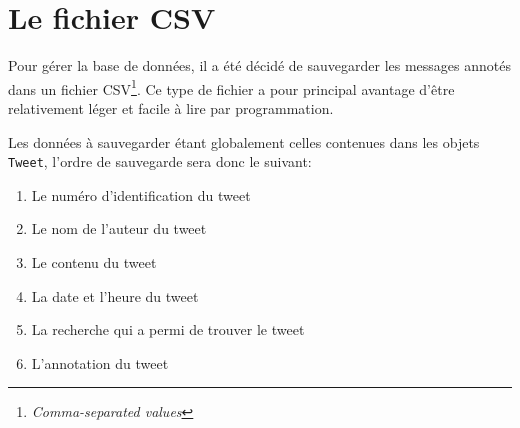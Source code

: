 \documentclass[12pt,a4paper]{report}
\begin{document}
\section{Le fichier CSV}

Pour gérer la base de données, il a été décidé de sauvegarder les messages
annotés dans un fichier CSV\footnote{\textit{Comma-separated values}}. Ce type
de fichier a pour principal avantage d'être relativement léger et facile à lire
par programmation.

Les données à sauvegarder étant globalement celles contenues dans les objets
\texttt{Tweet}, l'ordre de sauvegarde sera donc le suivant:

\begin{enumerate}
    \item
        Le numéro d'identification du tweet
    \item
        Le nom de l'auteur du tweet
    \item
        Le contenu du tweet
    \item
        La date et l'heure du tweet
    \item
        La recherche qui a permi de trouver le tweet
    \item
        L'annotation du tweet
\end{enumerate}
\end{document}

